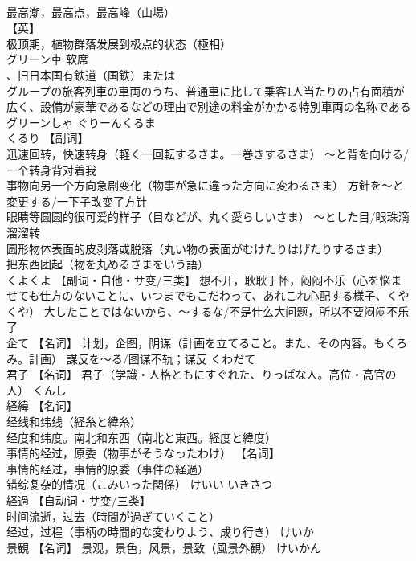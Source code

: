 \documentclass[8pt]{extreport}
\begin{document}
\begin{CJK}{UTF8}{min}
\\	最高潮，最高点，最高峰（山場） 
\\	【英】
\\	极顶期，植物群落发展到极点的状态（極相）		
\\	グリーン車	软席
\\	、旧日本国有鉄道（国鉄）または
\\	グループの旅客列車の車両のうち、普通車に比して乗客1人当たりの占有面積が広く、設備が豪華であるなどの理由で別途の料金がかかる特別車両の名称である	グリーンしゃ ぐりーんくるま	
\\	くるり	【副词】 
\\	迅速回转，快速转身（軽く一回転するさま。一巻きするさま） ～と背を向ける/一个转身背对着我 
\\	事物向另一个方向急剧变化（物事が急に違った方向に変わるさま） 方針を～と変更する/一下子改变了方针 
\\	眼睛等圆圆的很可爱的样子（目などが、丸く愛らしいさま） ～とした目/眼珠滴溜溜转 
\\	圆形物体表面的皮剥落或脱落（丸い物の表面がむけたりはげたりするさま） 
\\	把东西团起（物を丸めるさまをいう語）		
\\	くよくよ	【副词・自他・サ变/三类】 想不开，耿耿于怀，闷闷不乐（心を悩ませても仕方のないことに、いつまでもこだわって、あれこれ心配する様子、くやくや） 大したことではないから、～するな/不是什么大问题，所以不要闷闷不乐了		
\\	企て	【名词】 计划，企图，阴谋（計画を立てること。また、その内容。もくろみ。計画） 謀反を～る/图谋不轨；谋反	くわだて	
\\	君子	【名词】 君子（学識・人格ともにすぐれた、りっぱな人。高位・高官の人）	くんし	
\\	経緯	【名词】 
\\	经线和纬线（経糸と緯糸） 
\\	经度和纬度。南北和东西（南北と東西。経度と緯度） 
\\	事情的经过，原委（物事がそうなったわけ） 【名词】 
\\	事情的经过，事情的原委（事件の経過） 
\\	错综复杂的情况（こみいった関係）	けいい いきさつ	
\\	経過	【自动词・サ变/三类】 
\\	时间流逝，过去（時間が過ぎていくこと） 
\\	经过，过程（事柄の時間的な変わりよう、成り行き）	けいか	
\\	景観	【名词】 景观，景色，风景，景致（風景外観）	けいかん	

\end{CJK}
\end{document}
